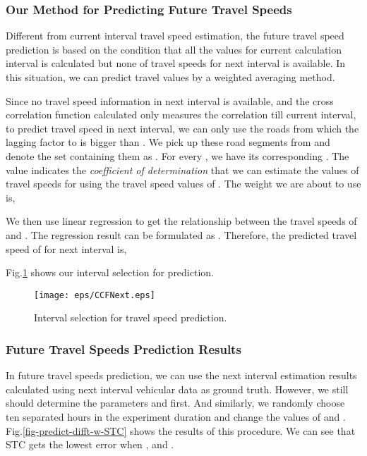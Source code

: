 \documentclass[twocolumn,10pt,final,conference]{IEEEtran}
\begin{document}
\subsubsection{Our Method for Predicting Future Travel Speeds}\label{section-Predicting Global Future Travel Speed}
\quad
Different from current interval travel speed estimation, the future travel speed prediction is based on the condition that all the values for current calculation interval is calculated but none of travel speeds for next interval is available. In this situation, we can predict travel values by a weighted averaging method.

Since no travel speed information in next interval is available, and the cross correlation function calculated only measures the correlation till current interval, to predict travel speed in next interval, we can only use the roads from which the lagging factor to  is bigger than . We pick up these road segments from  and denote  the set containing them as . For every , we have its corresponding . The value  indicates the \emph{coefficient of determination} that we can estimate the values of travel speeds for  using the travel speed values of . The weight we are about to use is,


We then use linear regression to get the relationship between the travel speeds of  and . The regression result can be formulated as .
Therefore, the predicted travel speed of  for next interval is,

Fig.\ref{fig-illustration of Next} shows our interval selection for prediction.

\begin{figure}[!h]
  \centering
\texttt{[image: eps/CCFNext.eps]}\\
  \caption{Interval selection for travel speed prediction.}
  \label{fig-illustration of Next}
\end{figure}

\subsubsection{Future Travel Speeds Prediction Results}\label{section-expe-future}
\quad

In future travel speeds prediction, we can use the next interval estimation results calculated using next interval vehicular data as ground truth. However, we still should determine the parameters  and  first. And similarly, we randomly choose ten separated hours in the experiment duration and change the values of  and . Fig.\ref{fig-predict-difft-w-STC} shows the results of this procedure. We can see that STC gets the lowest error when , and .
\end{document}

